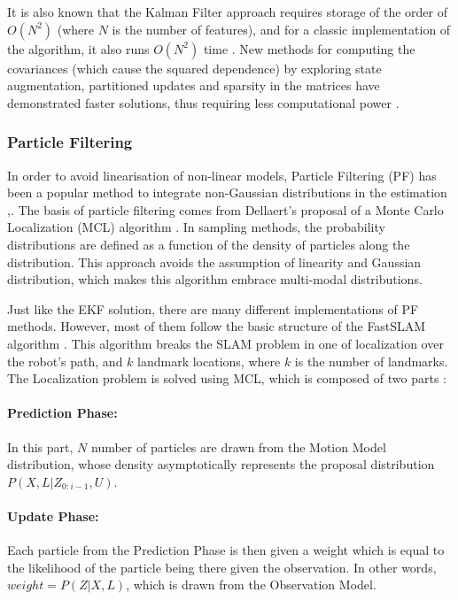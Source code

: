 \documentclass[11pt]{article}
\begin{document}
It is also known that the Kalman Filter approach requires storage of the order of $O(N^2)$ (where $N$ is the number of features), and for a classic implementation of the algorithm, it also runs $O(N^2)$ time \cite{CsorbaThesis}. New methods for computing the covariances (which cause the squared dependence) by exploring state augmentation, partitioned updates and sparsity in the matrices have demonstrated faster solutions, thus requiring less computational power \cite{SLAMPartII}.

	\subsubsection{Particle Filtering}

In order to avoid linearisation of non-linear models, Particle Filtering (PF) has been a popular method to integrate non-Gaussian distributions in the estimation \cite{Montemerlo02fastslam:a},\cite{772544}. The basis of particle filtering comes from Dellaert's proposal of a Monte Carlo Localization (MCL) algorithm \cite{772544}. In sampling methods, the probability distributions are defined as a function of the density of particles along the distribution. This approach avoids the assumption of linearity and Gaussian distribution, which makes this algorithm embrace multi-modal distributions.
	
Just like the EKF solution, there are many different implementations of PF methods. However, most of them follow the basic structure of the FastSLAM algorithm \cite{Montemerlo02fastslam:a}. This algorithm breaks the SLAM problem in one of localization over the robot's path, and $k$ landmark locations, where $k$ is the number of landmarks. The Localization problem is solved using MCL, which is composed of two parts \cite{772544}:
	 
\paragraph{Prediction Phase:} In this part, $N$ number of particles are drawn from the Motion Model distribution, whose density asymptotically represents the proposal distribution $P(X, L | Z_{0:i-1}, U)$.
	 
\paragraph{Update Phase:} Each particle from the Prediction Phase is then given a weight which is equal to the likelihood of the particle being there given the observation. In other words, $weight = P(Z|X, L)$, which is drawn from the Observation Model.
	 
\end{document}
